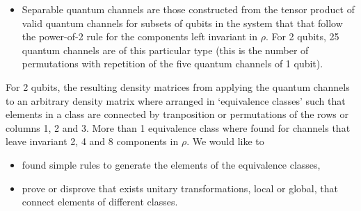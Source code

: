 \documentclass[11pt,dvipsnames]{article}
\begin{document}
\begin{itemize}
%


	\item Separable quantum channels are those constructed from the tensor product
				of valid quantum channels for subsets of qubits in the system that
				that follow the 
				power-of-2 rule for the components left invariant in $\rho$. For 2
				qubits, 25 quantum channels are of this particular type (this is the
				number of permutations with repetition of the five 
				quantum channels of 1 qubit). 
\end{itemize}

For 2 qubits, 
the resulting density matrices from applying the quantum channels
to an arbitrary density matrix where arranged in `equivalence classes' 
such that elements in a class are connected by tranposition or 
permutations of the rows or columns 1, 2 and 3. More than 1 equivalence class
where found for channels that leave invariant 2, 4 and 8 components in $\rho$.
We would like to
\begin{itemize}
	\item found simple rules to generate the elements 
				of the equivalence classes,
	\item prove or disprove that exists unitary transformations, local or global,
				that connect elements of different classes.
\end{itemize}









\vfill
\end{document}
